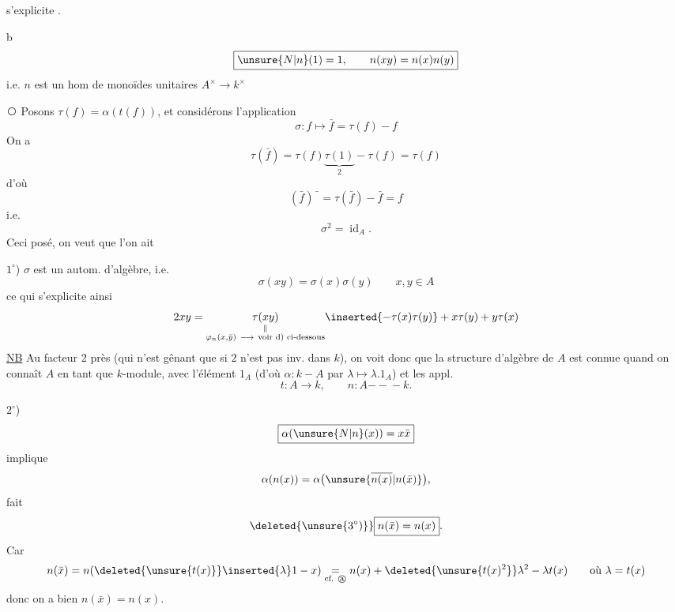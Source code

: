   s'explicite .

\textcircled{b}
\[
 \boxed{\unsure{N|n}(1)=1,\qquad n(xy)=n(x)n(y)}
\]
i.e. $n$ est un hom de monoïdes unitaires $A^\times\longrightarrow k^\times$

\textcircled{}
Posons $\tau(f)=\alpha(t(f))$, et considérons l'application
\[
 \sigma:f\longmapsto\bar f=\tau(f)-f
\]
On a
\[
 \tau(\bar f)=\tau(f)\underbrace{\tau(1)}_{2}-\tau(f)=\tau(f)
\]
d'où
\[
 (\bar f)\bar{\phantom f}=\tau(\bar f)-\bar f=f
\]
i.e. 
\[
 \sigma^2=\operatorname{id}_A.
\]
Ceci posé, on veut que l'on ait

\uline{$1^\circ$}) $\sigma$ est un autom. d'algèbre, i.e.
\[
 \boxed{\sigma(xy)=\sigma(x)\sigma(y)}\qquad x,y\in A
\]
ce qui s'explicite ainsi
\[
 2xy=\underset{\substack{\Vert\\\varphi_n(x,\bar y)\ \longrightarrow\ \text{voir d) ci-dessous}}}{\tau(xy)}\inserted{-\tau(x)\tau(y)}+x\tau(y)+y\tau(x)
\]
\uline{NB} Au facteur $2$ près (qui n'est gênant que  si $2$ n'est pas inv. dans $k$), on voit donc que la structure d'algèbre de $A$ est connue quand on connaît $A$ en tant que $k$-module, avec l'élément $1_A$ (d'où $\alpha:k\mathrel{-}A$ par $\lambda\mapsto\lambda.1_A$) et les appl.
\[
 t:A\longrightarrow k,\qquad n:A\mathrel{-\!\!-\!\!-}k.
\]

$2^\circ$)
\[
 \boxed{\alpha(\unsure{N|n}(x))=x\bar x}
\]
implique
\[
 \alpha(n(x))=\alpha\bigl(\unsure{\overline{n(x)}|n(\bar x)}\bigr),
\]
  fait
\[
 \deleted{\unsure{3^\circ)}}\boxed{n(\bar x)=n(x)}.
\]
Car
\[
 n(\bar x)=n(\deleted{\unsure{t(x)}}\inserted{\lambda}1-x)
 \underset{\text{cf. \textcircled{a}}}{=}
 n(x)+\deleted{\unsure{t(x)^2}}\lambda^2-\lambda t(x)
 \qquad\text{où }\lambda=t(x)
\]
donc on a bien $n(\bar x)=n(x)$.
